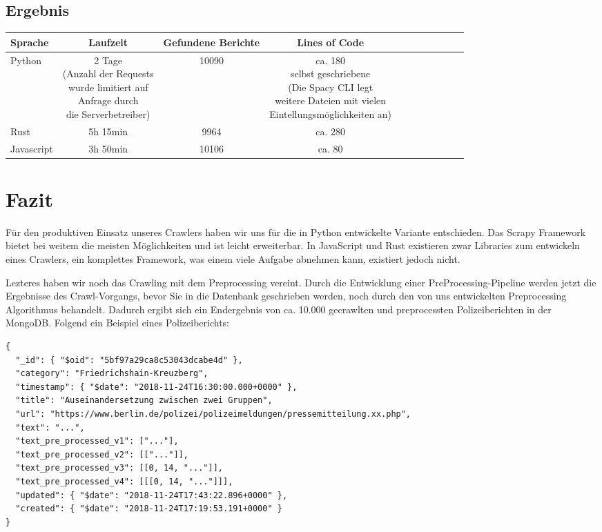 \subsection{Ergebnis}

\begin{tabular}{| l | c | c | c | c | c | c | c | c | c | c |}
	\hline
	Sprache    & Laufzeit & Gefundene Berichte & Lines of Code\\
	\hline
	Python     & \makecell{2 Tage \\ (Anzahl der Requests \\ wurde limitiert auf  \\ Anfrage durch \\ die Serverbetreiber)} & 10090 &  \makecell{ca. 180 \\ selbst geschriebene  \\ (Die Spacy CLI legt \\ weitere Dateien mit vielen \\ Eintellungsmöglichkeiten an)} \\
	\hline
	Rust       & 5h 15min & 9964 & ca. 280 \\
	\hline
	Javascript & 3h 50min & 10106 & ca. 80 \\
	\hline
\end{tabular}


\section{Fazit}
Für den produktiven Einsatz unseres Crawlers haben wir uns für die in Python entwickelte Variante entschieden.
Das Scrapy Framework bietet bei weitem die meisten Möglichkeiten und ist leicht erweiterbar.
In JavaScript und Rust existieren zwar Libraries zum entwickeln eines Crawlers, ein komplettes Framework, was einem
viele Aufgabe abnehmen kann, existiert jedoch nicht.

Lezteres haben wir noch das Crawling mit dem Preprocessing vereint. Durch die Entwicklung einer PreProcessing-Pipeline
werden jetzt die Ergebnisse des Crawl-Vorgangs, bevor Sie in die Datenbank geschrieben werden, noch durch den von uns
entwickelten Preprocessing Algorithmus behandelt. Dadurch ergibt sich ein Endergebnis von ca. 10.000 gecrawlten und preprocessten
Polizeiberichten in der MongoDB. Folgend ein Beispiel eines Polizeiberichts:

\begin{verbatim}
{
  "_id": { "$oid": "5bf97a29ca8c53043dcabe4d" },
  "category": "Friedrichshain-Kreuzberg",
  "timestamp": { "$date": "2018-11-24T16:30:00.000+0000" },
  "title": "Auseinandersetzung zwischen zwei Gruppen",
  "url": "https://www.berlin.de/polizei/polizeimeldungen/pressemitteilung.xx.php",
  "text": "...",
  "text_pre_processed_v1": ["..."],
  "text_pre_processed_v2": [["..."]],
  "text_pre_processed_v3": [[0, 14, "..."]],
  "text_pre_processed_v4": [[[0, 14, "..."]]],
  "updated": { "$date": "2018-11-24T17:43:22.896+0000" },
  "created": { "$date": "2018-11-24T17:19:53.191+0000" }
}
\end{verbatim}
